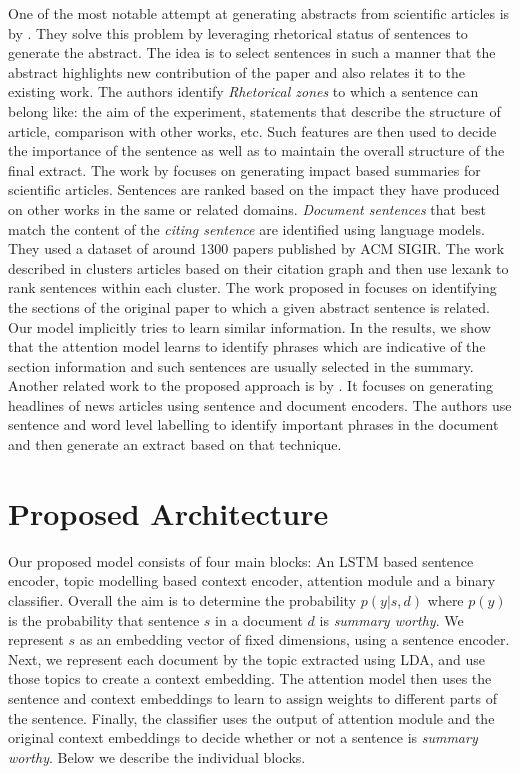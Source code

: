 One of the most notable attempt at generating abstracts from scientific articles is by \cite{teufel2002summarizing}. They solve this problem by leveraging rhetorical status of sentences to generate the abstract. The idea is to select sentences in such a manner that the abstract highlights new contribution of the paper and also relates it to the existing work. The authors identify \emph{Rhetorical zones} to which a sentence can belong like: the aim of the experiment, statements that describe the structure of article, comparison with other works, etc. Such features are then used to decide the importance of the sentence as well as to maintain the overall structure of the final extract. The work by \cite{mei2008generating} focuses on generating impact based summaries for scientific articles. Sentences are ranked based on the impact they have produced on other works in the same or related domains. \emph{Document sentences} that best match the content of the \emph{citing sentence} are identified using language models. They used a dataset of around 1300 papers published by ACM SIGIR. The work described in \cite{abu2011coherent} clusters articles based on their citation graph and then use lexank to rank sentences within each cluster. The work proposed in \cite{hirohata2008identifying} focuses on identifying the sections of the original paper to which a given abstract sentence is related. Our model implicitly tries to learn similar information. In the results, we show that the attention model learns to identify phrases which are indicative of the section information and such sentences are usually selected in the summary. Another related work to the proposed approach is by \cite{cheng2016neural}. It focuses on generating headlines of news articles using sentence and document encoders. The authors use sentence and word level labelling to identify important phrases in the document and then generate an extract based on that technique. 

\section{Proposed Architecture}

Our proposed model consists of four main blocks: An LSTM based sentence encoder, topic modelling based context encoder, attention module and a binary classifier. Overall the aim is to determine the probability $p(y|s,d)$ where $p(y)$ is the probability that sentence $s$ in a document $d$ is \emph{summary worthy}. We represent $s$ as an embedding vector of fixed dimensions, using a sentence encoder. Next, we represent each document by the topic extracted using LDA, and use those topics to create a context embedding. The attention model then uses the sentence and context embeddings to learn to assign weights to different parts of the sentence. Finally, the classifier uses the output of attention module and the original context embeddings to decide whether or not a sentence is \emph{summary worthy}. Below we describe the individual blocks.

